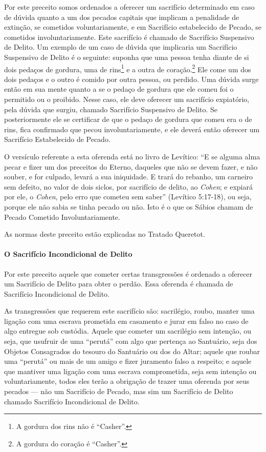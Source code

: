 Por este preceito somos ordenados a oferecer um sacrifício determinado
em caso de dúvida quanto a um dos pecados capitais que implicam a
penalidade de extinção, se cometidos voluntariamente, e em Sacrifício
estabelecido de Pecado, se cometidos involuntariamente. Este sacrifício
é chamado
de Sacrifício Suspensivo de Delito. Um exemplo de um caso de dúvida que
implicaria um Sacrifício Suspensivo de Delito é o seguinte: suponha que
uma
pessoa tenha diante de si dois pedaços de gordura, uma de rins\footnote{A gordura dos rins não é ``Casher''.}
e a outra de coração.\footnote{A gordura do coração é ``Casher''.} Ele come um dos dois pedaços
e o outro é comido por outra pessoa, ou perdido. Uma dúvida surge então
em sua mente quanto a se o pedaço de gordura que ele comeu foi o
permitido ou o proibido. Nesse caso, ele deve oferecer um sacrifício
expiatório, pela dúvida que surgiu, chamado Sacrifício Suspensivo de
Delito. Se posteriormente ele se certificar de que o pedaço de gordura
que comeu era o de rins, fica confirmado que pecou involuntariamente, e
ele deverá então oferecer um Sacrifício Estabelecido de Pecado.

O versículo referente a esta oferenda está no livro de Levítico: ``E se
alguma alma pecar e fizer um dos preceitos do Eterno, daqueles que não
se devem fazer, e não souber, e for culpado, levará a sua iniquidade. E
trará do rebanho, um carneiro sem defeito, no valor de dois siclos, por
sacrifício de delito, ao \textit{Cohen}; e expiará por ele, o \textit{Cohen}, pelo
erro que cometeu sem saber'' (Levítico 5:17-18), ou seja, porque ele
não sabia se tinha pecado ou não. Isto é o que os Sábios chamam de
Pecado Cometido Involuntariamente.

As normas deste preceito estão explicadas no Tratado Queretot.

\paragraph{O Sacrifício Incondicional de Delito}

Por este preceito aquele que cometer certas transgressões é ordenado a
oferecer um Sacrifício de Delito para obter o perdão. Essa oferenda é
chamada de Sacrifício Incondicional de Delito.

As transgressões que requerem este sacrifício são: sacrilégio, roubo,
manter uma ligação com uma escrava prometida em casamento e jurar em
falso no caso de algo entregue sob custódia. Aquele que cometer um
sacrilégio sem intenção, ou seja, que usufruir de uma ``perutá'' com
algo que pertença ao Santuário, seja dos Objetos Consagrados do tesouro
do Santuário ou dos do Altar; aquele que roubar uma ``perutá'' ou mais
de um amigo e fizer juramento falso a respeito; e aquele que mantiver
uma ligação com uma escrava comprometida, seja sem intenção ou
voluntariamente, todos eles terão a obrigação de trazer uma oferenda por seus pecados --- não um Sacrifício de Pecado, mas
sim um Sacrifício de Delito chamado Sacrifício Incondicional de Delito.

